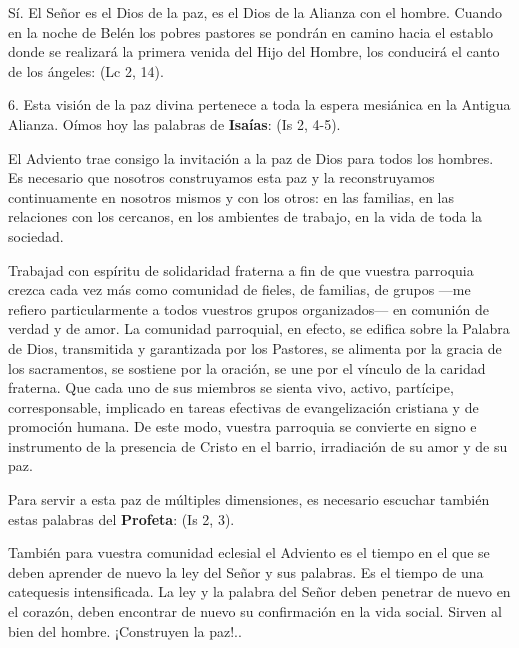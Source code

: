 \documentclass[]{article}
\begin{document}
Sí. El Señor es el Dios de la paz, es el Dios de la Alianza con el hombre. Cuando en la noche de Belén los pobres pastores se pondrán en camino hacia el establo donde se realizará la primera venida del Hijo del Hombre, los conducirá el canto de los ángeles:  (Lc 2, 14).

6. Esta visión de la paz divina pertenece a toda la espera mesiánica en la Antigua Alianza. Oímos hoy las palabras de \textbf{Isaías}:  (Is 2, 4-5).

El Adviento trae consigo la invitación a la paz de Dios para todos los hombres. Es necesario que nosotros construyamos esta paz y la reconstruyamos continuamente en nosotros mismos y con los otros: en las familias, en las relaciones con los cercanos, en los ambientes de trabajo, en la vida de toda la sociedad.

Trabajad con espíritu de solidaridad fraterna a fin de que vuestra parroquia crezca cada vez más como comunidad de fieles, de familias, de grupos ---me refiero particularmente a todos vuestros grupos organizados--- en comunión de verdad y de amor. La comunidad parroquial, en efecto, se edifica sobre la Palabra de Dios, transmitida y garantizada por los Pastores, se alimenta por la gracia de los sacramentos, se sostiene por la oración, se une por el vínculo de la caridad fraterna. Que cada uno de sus miembros se sienta vivo, activo, partícipe, corresponsable, implicado en tareas efectivas de evangelización cristiana y de promoción humana. De este modo, vuestra parroquia se convierte en signo e instrumento de la presencia de Cristo en el barrio, irradiación de su amor y de su paz.

Para servir a esta paz de múltiples dimensiones, es necesario escuchar también estas palabras del \textbf{Profeta}:  (Is 2, 3).

También para vuestra comunidad eclesial el Adviento es el tiempo en el que se deben aprender de nuevo la ley del Señor y sus palabras. Es el tiempo de una catequesis intensificada. La ley y la palabra del Señor deben penetrar de nuevo en el corazón, deben encontrar de nuevo su confirmación en la vida social. Sirven al bien del hombre. ¡Construyen la paz!..
\end{document}
